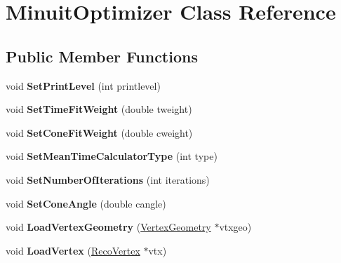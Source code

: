 \hypertarget{classMinuitOptimizer}{
\section{MinuitOptimizer Class Reference}
\label{classMinuitOptimizer}
}
\subsection*{Public Member Functions}
\begin{DoxyCompactItemize}
\item 
\hypertarget{classMinuitOptimizer_af957656cb1d0339c7cf0ad0199817786}{
void {\bfseries SetPrintLevel} (int printlevel)}
\label{classMinuitOptimizer_af957656cb1d0339c7cf0ad0199817786}

\item 
\hypertarget{classMinuitOptimizer_ab93bdadeff0f40951fc1ae38e637d1cd}{
void {\bfseries SetTimeFitWeight} (double tweight)}
\label{classMinuitOptimizer_ab93bdadeff0f40951fc1ae38e637d1cd}

\item 
\hypertarget{classMinuitOptimizer_ac386f4829b2838ecdf43f83071b9211d}{
void {\bfseries SetConeFitWeight} (double cweight)}
\label{classMinuitOptimizer_ac386f4829b2838ecdf43f83071b9211d}

\item 
\hypertarget{classMinuitOptimizer_abee6c05c3be56f9f91e5a2bf5425c6f9}{
void {\bfseries SetMeanTimeCalculatorType} (int type)}
\label{classMinuitOptimizer_abee6c05c3be56f9f91e5a2bf5425c6f9}

\item 
\hypertarget{classMinuitOptimizer_ad7a963c1aa7f84ba2312a432149dbf0e}{
void {\bfseries SetNumberOfIterations} (int iterations)}
\label{classMinuitOptimizer_ad7a963c1aa7f84ba2312a432149dbf0e}

\item 
\hypertarget{classMinuitOptimizer_ae30cc5de352fbd8df809926d56365bc8}{
void {\bfseries SetConeAngle} (double cangle)}
\label{classMinuitOptimizer_ae30cc5de352fbd8df809926d56365bc8}

\item 
\hypertarget{classMinuitOptimizer_a9f48b624230650920feff32180370fa2}{
void {\bfseries LoadVertexGeometry} (\hyperlink{classVertexGeometry}{VertexGeometry} $\ast$vtxgeo)}
\label{classMinuitOptimizer_a9f48b624230650920feff32180370fa2}

\item 
\hypertarget{classMinuitOptimizer_ab58594047959a1e05fdfd970667b1e04}{
void {\bfseries LoadVertex} (\hyperlink{classRecoVertex}{RecoVertex} $\ast$vtx)}
\label{classMinuitOptimizer_ab58594047959a1e05fdfd970667b1e04}


\end{DoxyCompactItemize}
